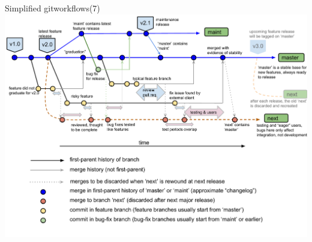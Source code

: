 \begin{frame}{Simplified gitworkflows(7)}
  \includegraphics[width=\textwidth]{figures/Git/simplified-gitworkflows7.pdf}
\end{frame}
